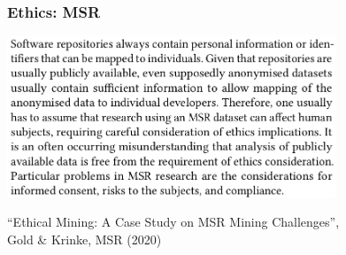 \documentclass[17pt,aspectratio=169,hyperref={pdfusetitle,colorlinks,allcolors=olive}]{beamer}
\begin{document}
\begin{frame}[fragile]
  \frametitle{Ethics: MSR}

  \includegraphics[height=4.8cm]{figs/paper-gold-krinke-conclusions}
  
  \begin{flushright}
    {\footnotesize
      ``Ethical Mining: A Case Study on MSR Mining Challenges'', \\
      Gold \& Krinke, MSR (2020) \\
    }
  \end{flushright}
  
\end{frame}
\end{document}
